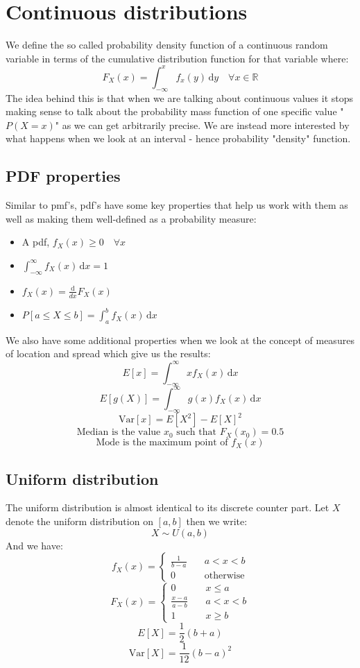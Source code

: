 \documentclass[12pt]{article}
\newcommand{\Var}[1]{\text{Var}[#1]}
\begin{document}
\section{Continuous distributions}
We define the so called probability density function of a continuous random variable in terms of the cumulative distribution function for that variable where:
\[F_X(x)=\int_{-\infty}^xf_x(y)\,\text{d}y\quad\forall x\in\mathbb{R}\]
The idea behind this is that when we are talking about continuous values it stops making sense to talk about the probability mass function of one specific value "\(P(X=x)\)" as we can get arbitrarily precise. We are instead more interested by what happens when we look at an interval - hence probability "density" function.
\subsection*{PDF properties}
Similar to pmf's, pdf's have some key properties that help us work with them as well as making them well-defined as a probability measure:
\begin{itemize}
    \item A pdf, \(f_X(x)\geq 0\quad\forall x\)
    \item \(\int_{-\infty}^\infty f_X(x)\,\text{d}x=1\)
    \item \(f_X(x)=\frac{\text{d}}{dx}F_X(x)\)
    \item \(P[a\leq X\leq b] = \int_a^b f_X(x)\,\text{d}x\)
\end{itemize}
We also have some additional properties when we look at the concept of measures of location and spread which give us the results:
\[E[x]=\int_{-\infty}^\infty xf_X(x)\,\text{d}x\]
\[E[g(X)]=\int_{-\infty}^\infty g(x)f_X(x)\,\text{d}x\]
\[\text{Var}[x]=E[X^2]-E[X]^2\]
\[\text{Median is the value }x_0\text{ such that }F_X(x_0)=0.5\]
\[\text{Mode is the maximum point of }f_X(x)\]
\subsection*{Uniform distribution}
The uniform distribution is almost identical to its discrete counter part. Let \(X\) denote the uniform distribution on \([a,b]\) then we write:
\[X\sim U(a,b)\]
And we have:
\[f_X(x)=\begin{cases}
    \frac{1}{b-a}&\quad a<x<b \\
    0&\quad \text{otherwise}
\end{cases}\]
\[F_X(x)=\begin{cases}
    0&\quad x\leq a \\
    \frac{x-a}{a-b}&\quad a<x<b \\
    1&\quad x\geq b
\end{cases}\]
\[E[X]=\frac{1}{2}(b+a)\]
\[\Var{X}=\frac{1}{12}(b-a)^2\]
\end{document}
